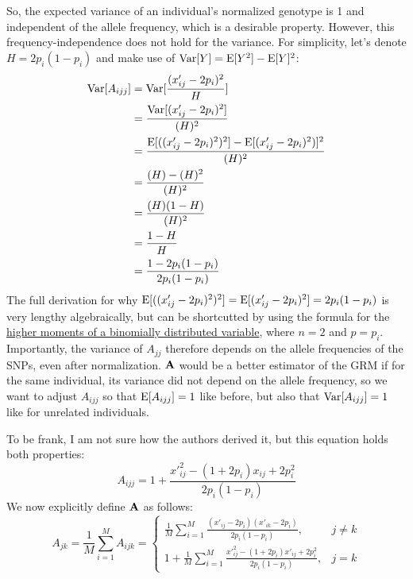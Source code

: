 \documentclass[12pt]{article}
\begin{document}
So, the expected variance of an individual's normalized genotype is 1 and independent of the allele frequency, which is a desirable property.
However, this frequency-independence does not hold for the variance.
For simplicity, let's denote $H = 2 p_i (1 - p_i)$ and make use of $\mathrm{Var}[Y] = \mathrm{E}[Y^2] - \mathrm{E}[Y]^2$:
\begin{align*}
    \mathrm{Var}[A_{ijj}] &= \mathrm{Var}[\frac{(x'_{ij} - 2 p_i)^2}{H}] \\
    &= \frac{\mathrm{Var}[(x'_{ij} - 2 p_i)^2]}{(H)^2} \\
    &= \frac{\mathrm{E}[((x'_{ij} - 2 p_i)^2)^2] - \mathrm{E}[(x'_{ij} - 2 p_i)^2)]^2}{(H)^2} \\
    &= \frac{(H) - (H)^2}{(H)^2} \\
    &= \frac{(H)(1  - H)}{(H)^2} \\
    &= \frac{1 - H}{H} \\
    &= \frac{1 - 2 p_i (1 - p_i)}{2 p_i (1 - p_i)} \\
\end{align*}
The full derivation for why $\mathrm{E}[((x'_{ij} - 2 p_i)^2)^2] = \mathrm{E}[(x'_{ij} - 2 p_i)^2] = 2 p_i (1 - p_i)$ is very lengthy algebraically, but can be shortcutted by using the formula for the \href{https://en.wikipedia.org/wiki/Binomial_distribution#Higher_moments}{higher moments of a binomially distributed variable}, where $n=2$ and $p=p_i$.
Importantly, the variance of $A_{jj}$ therefore depends on the allele frequencies of the SNPs, even after normalization.
$\mathbf{A}$ would be a better estimator of the GRM if for the same individual, its variance did not depend on the allele frequency, so we want to adjust $A_{ijj}$ so that $\mathrm{E}[A_{ijj}] = 1$ like before, but also that $\mathrm{Var}[A_{ijj}] = 1$ like for unrelated individuals.

To be frank, I am not sure how the authors derived it, but this equation holds both properties:
$$A_{ijj} = 1 + \frac{{x'}_{ij}^2 - (1 + 2 p_i) x_{ij} + 2 p_i^2}{2 p_i (1 - p_i)} $$
We now explicitly define $\mathbf{A}$ as follows:
$$
A_{jk} = \frac{1}{M}\sum_{i=1}^{M} A_{ijk} = 
\begin{cases}
\frac{1}{M}\sum_{i=1}^{M} \frac{(x'_{ij} - 2 p_i)(x'_{ik} - 2 p_i)}{ 2 p_i (1 - p_i)}, & j \neq k \\[10pt]
1 + \frac{1}{M}\sum_{i=1}^{M} \frac{{x'}_{ij}^2 - (1 + 2 p_i) x'_{ij} + 2 p_i^2}{2 p_i (1 - p_i)}, & j = k
\end{cases}
$$
\end{document}
